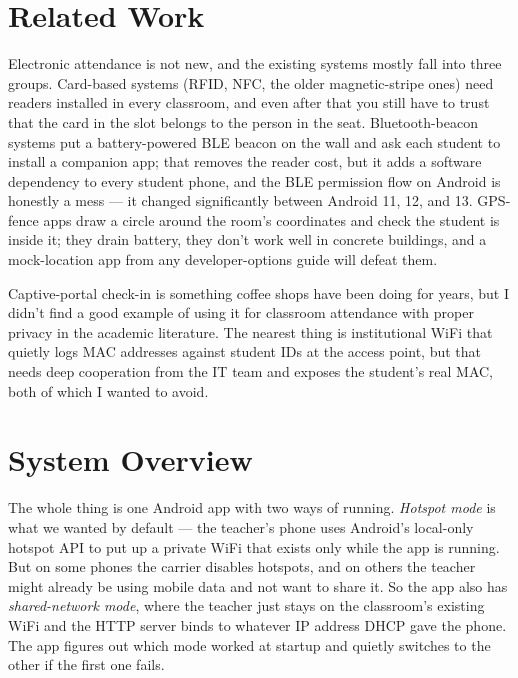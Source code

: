 \documentclass[sigconf,10pt]{acmart}
\begin{document}
\section{Related Work}

Electronic attendance is not new, and the existing systems mostly
fall into three groups. Card-based systems (RFID, NFC, the older
magnetic-stripe ones) need readers installed in every classroom,
and even after that you still have to trust that the card in the
slot belongs to the person in the seat. Bluetooth-beacon systems
put a battery-powered BLE beacon on the wall and ask each student
to install a companion app; that removes the reader cost, but it
adds a software dependency to every student phone, and the BLE
permission flow on Android is honestly a mess --- it changed
significantly between Android 11, 12, and 13. GPS-fence apps draw
a circle around the room's coordinates and check the student is
inside it; they drain battery, they don't work well in concrete
buildings, and a mock-location app from any developer-options
guide will defeat them.

Captive-portal check-in is something coffee shops have been doing
for years, but I didn't find a good example of using it for
classroom attendance with proper privacy in the academic
literature. The nearest thing is institutional WiFi that quietly
logs MAC addresses against student IDs at the access point, but
that needs deep cooperation from the IT team and exposes the
student's real MAC, both of which I wanted to avoid.

\section{System Overview}

The whole thing is one Android app with two ways of running.
\emph{Hotspot mode} is what we wanted by default --- the teacher's
phone uses Android's local-only hotspot API to put up a private
WiFi that exists only while the app is running. But on some phones
the carrier disables hotspots, and on others the teacher might
already be using mobile data and not want to share it. So the app
also has \emph{shared-network mode}, where the teacher just stays
on the classroom's existing WiFi and the HTTP server binds to
whatever IP address DHCP gave the phone. The app figures out which
mode worked at startup and quietly switches to the other if the
first one fails.
\end{document}
